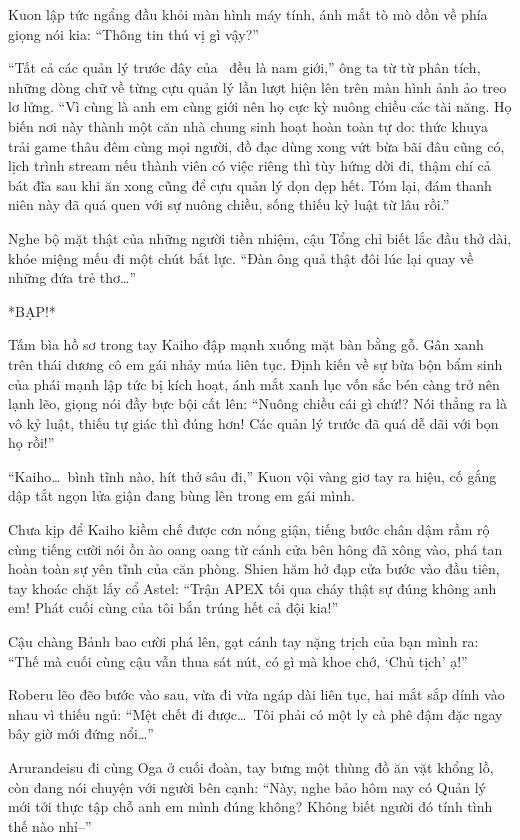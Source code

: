 \documentclass[../main.tex]{subfiles}
\begin{document}
Kuon lập tức ngẩng đầu khỏi màn hình máy tính, ánh mắt tò mò dồn về phía giọng nói kia: ``Thông tin thú vị gì vậy?''

``Tất cả các quản lý trước đây của \hls\ đều là nam giới,'' ông ta từ từ phân tích, những dòng chữ về từng cựu quản lý lần lượt hiện lên trên màn hình ảnh ảo treo lơ lửng. ``Vì cùng là anh em cùng giới nên họ cực kỳ nuông chiều các tài năng. Họ biến nơi này thành một căn nhà chung sinh hoạt hoàn toàn tự do: thức khuya trải game thâu đêm cùng mọi người, đồ đạc dùng xong vứt bừa bãi đâu cũng có, lịch trình stream nếu thành viên có việc riêng thì tùy hứng dời đi, thậm chí cả bát đĩa sau khi ăn xong cũng để cựu quản lý dọn dẹp hết. Tóm lại, đám thanh niên này đã quá quen với sự nuông chiều, sống thiếu kỷ luật từ lâu rồi.''

Nghe bộ mặt thật của những người tiền nhiệm, cậu Tổng chỉ biết lắc đầu thở dài, khóe miệng mếu đi một chút bất lực. ``Đàn ông quả thật đôi lúc lại quay về những đứa trẻ thơ\dots''

*BẠP!*

Tấm bìa hồ sơ trong tay Kaiho đập mạnh xuống mặt bàn bằng gỗ. Gân xanh trên thái dương cô em gái nhảy múa liên tục. Định kiến về sự bừa bộn bẩm sinh của phái mạnh lập tức bị kích hoạt, ánh mắt xanh lục vốn sắc bén càng trở nên lạnh lẽo, giọng nói đầy bực bội cất lên: ``Nuông chiều cái gì chứ!? Nói thẳng ra là vô kỷ luật, thiếu tự giác thì đúng hơn! Các quản lý trước đã quá dễ dãi với bọn họ rồi!''

``Kaiho\dots\ bình tĩnh nào, hít thở sâu đi,'' Kuon vội vàng giơ tay ra hiệu, cố gắng dập tắt ngọn lửa giận đang bùng lên trong em gái mình.

Chưa kịp để Kaiho kiềm chế được cơn nóng giận, tiếng bước chân dậm rầm rộ cùng tiếng cười nói ồn ào oang oang từ cánh cửa bên hông đã xông vào, phá tan hoàn toàn sự yên tĩnh của căn phòng. Shien hăm hở đạp cửa bước vào đầu tiên, tay khoác chặt lấy cổ Astel: ``Trận APEX tối qua cháy thật sự đúng không anh em! Phát cuối cùng của tôi bắn trúng hết cả đội kia!''

Cậu chàng Bảnh bao cười phá lên, gạt cánh tay nặng trịch của bạn mình ra: ``Thế mà cuối cùng cậu vẫn thua sát nút, có gì mà khoe chớ, `Chủ tịch' ạ!''

Roberu lẽo đẽo bước vào sau, vừa đi vừa ngáp dài liên tục, hai mắt sắp dính vào nhau vì thiếu ngủ: ``Mệt chết đi được\dots\ Tôi phải có một ly cà phê đậm đặc ngay bây giờ mới đứng nổi\dots''

Arurandeisu đi cùng Oga ở cuối đoàn, tay bưng một thùng đồ ăn vặt khổng lồ, còn đang nói chuyện với người bên cạnh: ``Này, nghe bảo hôm nay có Quản lý mới tới thực tập chỗ anh em mình đúng không? Không biết người đó tính tình thế nào nhỉ--''
\end{document}
